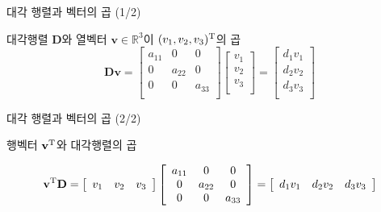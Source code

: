 \begin{frame}{대각 행렬과 벡터의 곱 (1/2)}

대각행렬 $\mathbf D$와 열벡터 $\mathbf v \in \mathbb R^3$이 $(v_1, v_2, v_3)^{\rm T}$의 곱
$$
\mathbf {Dv} = 
\left [ 
\begin{array}{ccc}
a_{11} & 0 & 0 \\
0 & a_{22} & 0 \\
0 & 0 & a_{33} \\
\end{array}
\right ]
\left [
\begin{array}{c}
v_1 \\
v_2 \\
v_3 \\
\end{array}
\right ]
=
\left [
\begin{array}{c}
d_1 v_1 \\
d_2 v_2 \\
d_3 v_3 \\
\end{array}
\right ]
$$
\end{frame}


\begin{frame}{대각 행렬과 벡터의 곱 (2/2)}

행벡터 $\mathbf v^{\rm T}$와 대각행렬의 곱

$$
\mathbf v^{\rm T} \mathbf D = 
\left [
\begin{array}{ccc}
v_1 & v_2 & v_3 \\
\end{array}
\right ]
\left [ 
\begin{array}{ccc}
a_{11} & 0 & 0 \\
0 & a_{22} & 0 \\
0 & 0 & a_{33} \\
\end{array}
\right ]
=
\left [
\begin{array}{ccc}
d_1 v_1 & d_2 v_2 &d_3 v_3 \\
\end{array}
\right ]
$$

\end{frame}


